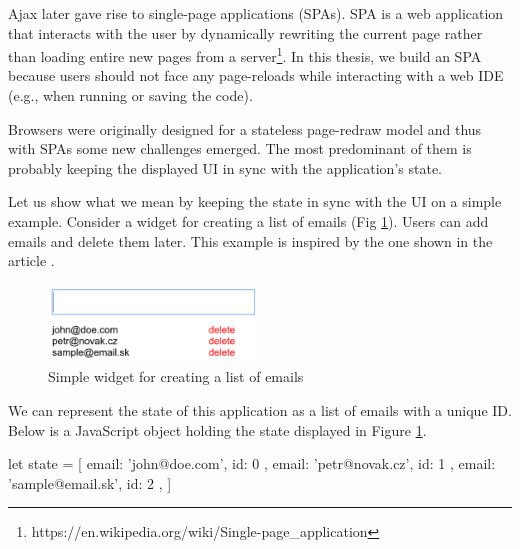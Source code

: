 Ajax later gave rise to single-page applications (SPAs). SPA is a web application that interacts with the user by dynamically rewriting
the current page rather than loading entire new pages from a server\footnote{https://en.wikipedia.org/wiki/Single-page\_application}. In this thesis,
we build an SPA because users should not face any page-reloads while interacting with a web IDE (e.g., when running or saving the code).  

Browsers were originally designed for a stateless page-redraw model and thus with SPAs some new challenges emerged. The most predominant of them is
probably keeping the displayed UI in sync with the application's state.

Let us show what we mean by keeping the state in sync with the UI on a simple example. Consider a widget for creating a list of emails (Fig \ref{fig:chap2:emails}).
Users can add emails and delete them later. This example is inspired by the one shown in the article \cite{JSFramework}.
\begin{figure}[!hbt]
    \centering
	\includegraphics[width=0.5\textwidth]{../img/emails}
	\caption{Simple widget for creating a list of emails}
	\label{fig:chap2:emails}
\end{figure}

We can represent the state of this application as a list of emails with a unique ID. Below is a JavaScript object holding the state displayed in
Figure \ref{fig:chap2:emails}.
\begin{code}
let state = [
    { email: 'john@doe.com', id: 0 },
    { email: 'petr@novak.cz', id: 1 },
    { email: 'sample@email.sk', id: 2 },
]
\end{code}

